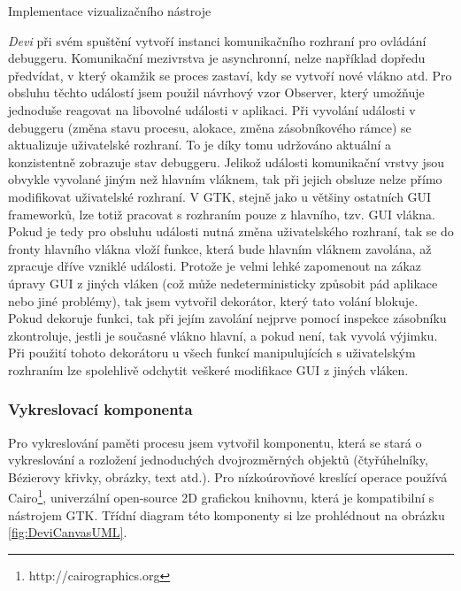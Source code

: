 \documentclass[czech,bachelor,male,python,dept460]{diploma}						%
\newcommand{\parspace}[1][]{
	\ifthenelse{\isempty{#1}}{\vspace{5mm}}{\vspace{#1}}
	\par
}
\begin{document}
\begin{section}{Implementace vizualizačního nástroje}
	\parspace \textit{Devi} při svém spuštění vytvoří instanci komunikačního rozhraní pro ovládání debuggeru. Komunikační mezivrstva je asynchronní,
	nelze například dopředu předvídat, v který okamžik se proces zastaví, kdy se vytvoří nové vlákno atd. Pro obsluhu těchto událostí jsem použil návrhový vzor
	Observer\cite[326]{gof}, který umožňuje jednoduše reagovat na libovolné události v aplikaci. Při vyvolání události v debuggeru (změna stavu procesu,
	alokace, změna zásobníkového rámce) se aktualizuje uživatelské rozhraní. To je díky tomu udržováno aktuální a konzistentně zobrazuje
	stav debuggeru. Jelikož události komunikační vrstvy jsou obvykle vyvolané jiným než hlavním vláknem, tak při jejich obsluze nelze přímo modifikovat uživatelské
	rozhraní. V GTK, stejně jako u většiny ostatních GUI frameworků, lze totiž pracovat s rozhraním pouze z hlavního, tzv. GUI vlákna. Pokud je tedy pro
	obsluhu události nutná změna uživatelského rozhraní, tak se do fronty hlavního vlákna vloží funkce, která bude hlavním vláknem zavolána,
	až zpracuje dříve vzniklé události. Protože je velmi lehké zapomenout na zákaz úpravy GUI z jiných vláken (což může nedeterministicky způsobit pád
	aplikace nebo jiné problémy), tak jsem vytvořil dekorátor, který tato volání blokuje. Pokud dekoruje funkci, tak při jejím zavolání
	nejprve pomocí inspekce zásobníku zkontroluje, jestli je současné vlákno hlavní, a pokud není, tak vyvolá výjimku. Při použití tohoto dekorátoru u všech
	funkcí manipulujících s uživatelským rozhraním lze spolehlivě odchytit veškeré modifikace GUI z jiných vláken.
	
	\subsubsection{Vykreslovací komponenta}
	Pro vykreslování paměti procesu jsem vytvořil komponentu, která se stará o vykreslování a rozložení jednoduchých dvojrozměrných objektů
	(čtyřúhelníky, Bézierovy křivky, obrázky, text atd.). Pro nízkoúrovňové kreslící operace používá Cairo\footnote{http://cairographics.org}, univerzální
	open-source 2D grafickou knihovnu, která je kompatibilní s nástrojem GTK. Třídní diagram této komponenty si lze prohlédnout na obrázku
	\ref{fig:DeviCanvasUML}.
	
	

\end{section}
\end{document}
